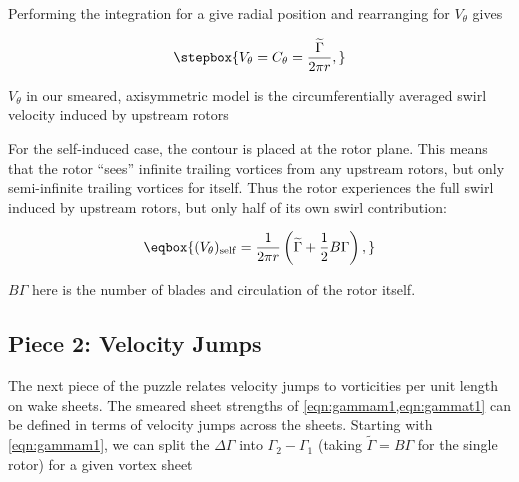 \noindent Performing the integration for a give radial position and rearranging for \(V_\theta\) gives

\begin{equation}
    \label{eqn:vtheta}
    \stepbox{
    V_\theta = C_\theta = \frac{\widetilde{\Gamma}}{2 \pi r},
}
\end{equation}

\where \(V_\theta\) in our smeared, axisymmetric model is the circumferentially averaged swirl velocity induced by upstream rotors

For the self-induced case, the contour is placed at the rotor plane.
%
This means that the rotor ``sees'' infinite trailing vortices from any upstream rotors, but only semi-infinite trailing vortices for itself.
%
Thus the rotor experiences the full swirl induced by upstream rotors, but only half of its own swirl contribution:

\begin{equation}
    \label{eqn:vthetaself}
    \eqbox{
        (V_\theta)_\mathrm{self} = \frac{1}{2 \pi r} \left( \widetilde{\Gamma} + \frac{1}{2} B \Gamma \right),
    }
\end{equation}



\where \(B \Gamma\) here is the number of blades and circulation of the rotor itself.


\subsection{Piece 2: Velocity Jumps}

The next piece of the puzzle relates velocity jumps to vorticities per unit length on wake sheets.
%
The smeared sheet strengths of \cref{eqn:gammam1,eqn:gammat1} can be defined in terms of velocity jumps across the sheets.
Starting with \cref{eqn:gammam1}, we can split the \(\Delta\Gamma\) into \(\Gamma_2 - \Gamma_1\) (taking \(\widetilde{\Gamma} = B\Gamma\) for the single rotor) for a given vortex sheet


